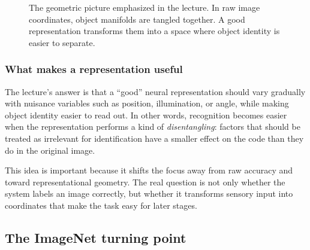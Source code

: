 \begin{figure}[h]
\centering
{}
\caption{The geometric picture emphasized in the lecture. In raw image coordinates, object manifolds are tangled together. A good representation transforms them into a space where object identity is easier to separate.}
\end{figure}

\subsubsection{What makes a representation useful}

The lecture's answer is that a ``good'' neural representation should vary gradually with nuisance variables such as position, illumination, or angle, while making object identity easier to read out. In other words, recognition becomes easier when the representation performs a kind of \emph{disentangling}: factors that should be treated as irrelevant for identification have a smaller effect on the code than they do in the original image.

This idea is important because it shifts the focus away from raw accuracy and toward representational geometry. The real question is not only whether the system labels an image correctly, but whether it transforms sensory input into coordinates that make the task easy for later stages.

\subsection{The ImageNet turning point}

